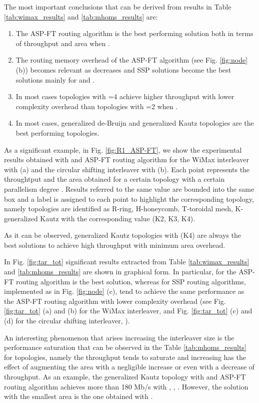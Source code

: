 \documentclass[10pt,twocolumn,journal]{IEEEtran}
\begin{document}
The most important conclusions that can be derived from results in Table \ref{tab:wimax_results} and 
\ref{tab:mhoms_results} are:
\begin{enumerate}
\item The ASP-FT routing algorithm is the best performing solution both in terms of throughput and area 
when .
\item The routing memory overhead of the ASP-FT algorithm (see Fig. \ref{fig:node} (b)) becomes 
relevant as  decreases and SSP solutions become the best solutions mainly for  and .
\item In most cases topologies with =4 achieve higher throughput with lower complexity overhead than topologies 
with =2 when .
\item In most cases, generalized de-Bruijn and generalized Kautz topologies are the best performing topologies.
\end{enumerate}
As a significant example, in Fig. \ref{fig:R1_ASP-FT}, 
we show the experimental results obtained with  and ASP-FT routing algorithm 
for the WiMax interleaver with  (a) and the circular shifting interleaver with  (b).
Each point represents the throughtput and the area 
obtained for a certain topology with a certain parallelism degree . Results referred to the same  value are bounded 
into the same box and a label is assigned to each point to highlight the corresponding topology, namely 
topologies are identified as R-ring, H-honeycomb, T-toroidal mesh, K-generalized Kautz 
with the corresponding  value (K2, K3, K4).

As it can be observed, 
generalized Kautz topologies with  (K4) are always the best solutions to achieve high throughput 
with minimum area overhead.

In Fig. \ref{fig:tar_tot} significant results extracted from Table \ref{tab:wimax_results} and \ref{tab:mhoms_results}
are shown in graphical form. In particular, for  the ASP-FT routing algorithm is the best solution, whereas for 
 SSP routing algorithms, implemented as in Fig. \ref{fig:node} (c), tend to achieve 
the same performance as the ASP-FT routing algorithm with lower complexity overhead (see 
Fig. \ref{fig:tar_tot} (a) and (b) for the WiMax interleaver,  and Fig. \ref{fig:tar_tot} (c) and (d) for the circular shifting 
interleaver, ).


An interesting phenomenon that arises increasing the interleaver size is the performance saturation that can 
be observed in the Table \ref{tab:mhoms_results} for  topologies, namely 
the throughput tends to saturate 
and increasing  has the effect of augmenting the area with a negligible increase or even with a decrease of throughput.
As an example, the generalized Kautz topology with  and ASP-FT routing algorithm achieves more than 180 Mb/s 
with , , . However, the solution with the smallest area is the one obtained with .
\end{document}
